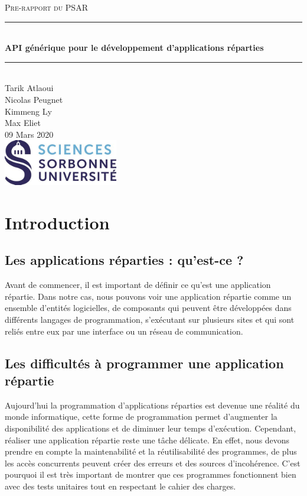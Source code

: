 \documentclass{article}
\date{\today}
\author{Tarik Atlaoui \\ Nicolas Peugnet \\ Kimmeng Ly \\ Max Eliet}
\begin{document}
\begin{titlepage}
	\enlargethispage{2cm}
	\newcommand{\HRule}{\rule{\linewidth}{0.5mm}}
	\center
	\textsc{\LARGE
	Pre-rapport du PSAR 
	} \\[1cm]
	\HRule \\[0.4cm]
	{ \huge \bfseries API générique pour le développement d'applications réparties \\[0.15cm] }
	\HRule \\[4cm]
	\large{Tarik Atlaoui \\[3mm] Nicolas Peugnet \\[3mm] Kimmeng Ly \\[3mm] Max Eliet} \\[3cm]
	09 Mars 2020 \\[3cm]
	\hfill \includegraphics[width=5cm]{logoSU.jpg}
\end{titlepage}

	\newpage
		\section{Introduction}
			\subsection{Les applications réparties : qu'est-ce ?}
			\large{ Avant de commencer, il est important de définir ce qu’est une application répartie. Dans notre cas, nous pouvons voir une application répartie comme un ensemble d’entités logicielles, de composants qui peuvent être développées dans différents langages de programmation, s’exécutant sur plusieurs sites et qui sont reliés entre eux par une interface ou un réseau de communication.}
			\subsection{Les difficultés à programmer une application répartie}
			\large { Aujourd’hui la programmation d’applications réparties est devenue une réalité du monde informatique, cette forme de programmation permet d'augmenter la disponibilité des applications et de diminuer leur temps d'exécution. Cependant, réaliser une application répartie reste une tâche délicate. En effet, nous devons prendre en compte la maintenabilité et la réutilisabilité des programmes, de plus les accès concurrents peuvent créer des erreurs et des sources d'incohérence. C’est pourquoi il est très important de montrer que ces programmes fonctionnent bien avec des tests unitaires tout en respectant le cahier des charges.}
\end{document}
